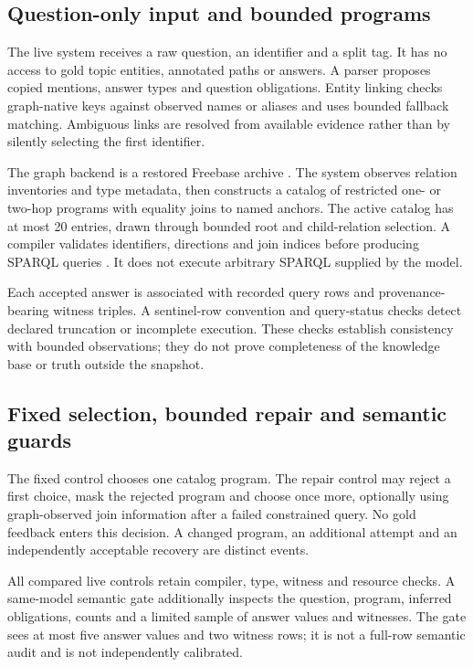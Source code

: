 \documentclass[10pt]{article}
\begin{document}
\subsection{Question-only input and bounded programs}

The live system receives a raw question, an identifier and a split tag. It has no access to gold topic entities, annotated paths or answers. A parser proposes copied mentions, answer types and question obligations. Entity linking checks graph-native keys against observed names or aliases and uses bounded fallback matching. Ambiguous links are resolved from available evidence rather than by silently selecting the first identifier.\par

The graph backend is a restored Freebase archive \cite{bollacker2008freebase}. The system observes relation inventories and type metadata, then constructs a catalog of restricted one- or two-hop programs with equality joins to named anchors. The active catalog has at most 20 entries, drawn through bounded root and child-relation selection. A compiler validates identifiers, directions and join indices before producing SPARQL queries \cite{harris2013sparql}. It does not execute arbitrary SPARQL supplied by the model.\par

Each accepted answer is associated with recorded query rows and provenance-bearing witness triples. A sentinel-row convention and query-status checks detect declared truncation or incomplete execution. These checks establish consistency with bounded observations; they do not prove completeness of the knowledge base or truth outside the snapshot.\par

\subsection{Fixed selection, bounded repair and semantic guards}

The fixed control chooses one catalog program. The repair control may reject a first choice, mask the rejected program and choose once more, optionally using graph-observed join information after a failed constrained query. No gold feedback enters this decision. A changed program, an additional attempt and an independently acceptable recovery are distinct events.\par

All compared live controls retain compiler, type, witness and resource checks. A same-model semantic gate additionally inspects the question, program, inferred obligations, counts and a limited sample of answer values and witnesses. The gate sees at most five answer values and two witness rows; it is not a full-row semantic audit and is not independently calibrated.\par
\end{document}

